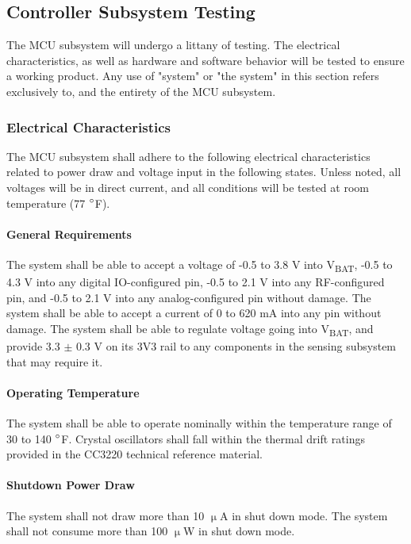 \subsection{Controller Subsystem Testing}
\label{sec:controller_subsystem_testing}
The MCU subsystem will undergo a littany of testing. The electrical
characteristics, as well as hardware and software behavior will be tested to
ensure a working product. Any use of "system" or "the system" in this section refers exclusively to, and the entirety of the MCU subsystem.

\subsubsection{Electrical Characteristics}
The MCU subsystem shall adhere to the following electrical characteristics
related to power draw and voltage input in the following states. Unless noted,
all voltages will be in direct current, and all conditions will be tested at
room temperature (77 $\degree$F). 

\paragraph{General Requirements} The system shall be able to accept a voltage
of -0.5 to 3.8 V into V\textsubscript{BAT}, -0.5 to 4.3 V into any digital
IO-configured pin, -0.5 to 2.1 V into any RF-configured pin, and -0.5 to 2.1 V
into any analog-configured pin without damage. The system shall be able to
accept a current of 0 to 620 mA into any pin without damage. The system shall
be able to regulate voltage going into V\textsubscript{BAT}, and provide 3.3 $\pm$ 0.3 V
on its 3V3 rail to any components in the sensing
subsystem that may require it.

\paragraph{Operating Temperature} The system shall be able to operate
nominally within the temperature range of 30 to 140 $\degree$F. Crystal
oscillators shall fall within the thermal drift ratings provided in the
CC3220 technical reference material.

\paragraph{Shutdown Power Draw} The system shall not draw more than 10
$\upmu$A in shut down mode. The system shall not consume more than 100
$\upmu$W in shut down mode.

